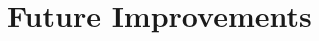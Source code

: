 \documentclass[conference]{IEEEtran}
\begin{document}
\section{Future Improvements}

%
%
%
%
\end{document}
